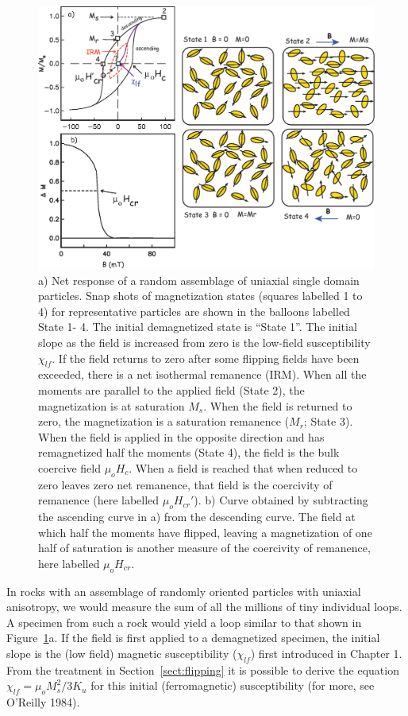 \begin{figure}[h!tb]
\centering  \includegraphics[width=14 cm]{EPSfiles/sdloops.eps}
\caption{a)  Net response of a random assemblage of  uniaxial single domain particles.  Snap shots of magnetization states (squares labelled 1 to 4)  for representative particles  are shown in the balloons labelled State 1- 4.   The initial demagnetized state is ``State 1''.  The initial slope as the field is increased from zero is the low-field susceptibility $\chi_{lf}$.      If the field returns to zero after some flipping fields have been exceeded, there is a net 
isothermal remanence (IRM).   When all the moments are parallel to the applied field (State 2), the magnetization is at saturation $M_s$. When the field is returned to zero, the magnetization is a saturation remanence ($M_r$; State 3).    When the field is applied in the opposite direction and has remagnetized half the moments (State 4), the field is the  bulk coercive field $\mu_oH_c$.   When a field is reached that when reduced to zero leaves zero net remanence, that field is  the coercivity of remanence (here labelled $\mu_oH_{cr}'$).    b)  Curve obtained by subtracting the ascending curve in a)  from the descending curve.  The field at which half the moments have flipped, leaving a magnetization of one half of saturation is another measure of the coercivity of remanence, here labelled $\mu_oH_{cr}$.}
\label{fig:sdloops}
\end{figure}


In rocks with an assemblage of randomly oriented particles with uniaxial anisotropy, we would measure the sum of all the millions of tiny individual loops.  A specimen from such a rock would yield a loop similar to that shown in Figure~\ref{fig:sdloops}a.  If the field is first applied to a demagnetized specimen, the initial slope is the (low field) 
magnetic susceptibility ($\chi_{lf}$) first introduced in  Chapter 1.   From the treatment in Section~\ref{sect:flipping} it is possible to derive the equation $\chi_{lf} = \mu_o M_s^2/3K_u$ for this initial (ferromagnetic) susceptibility (for more, see
\nocite{oreilly84}
O'Reilly 1984). 



